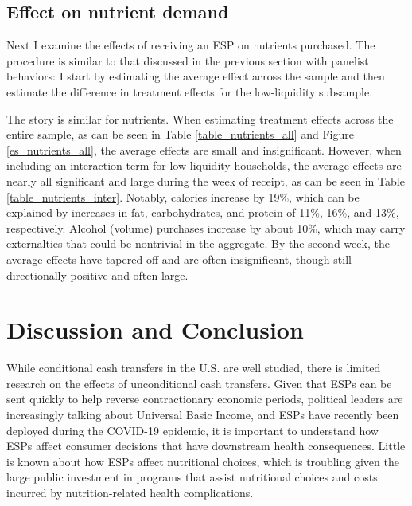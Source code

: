 \documentclass[12pt]{article}
\begin{document}
\subsection{Effect on nutrient demand}

Next I examine the effects of receiving an ESP on nutrients purchased.
The procedure is similar to that discussed in the previous section with panelist behaviors: I start by estimating the average effect across the sample and then estimate the difference in treatment effects for the low-liquidity subsample.

The story is similar for nutrients.
When estimating treatment effects across the entire sample, as can be seen in Table \ref{table_nutrients_all} and Figure \ref{es_nutrients_all}, the average effects are small and insignificant.
However, when including an interaction term for low liquidity households, the average effects are nearly all significant and large during the week of receipt, as can be seen in Table \ref{table_nutrients_inter}.
Notably, calories increase by 19\%, which can be explained by increases in fat, carbohydrates, and protein of 11\%, 16\%, and 13\%, respectively.
Alcohol (volume) purchases increase by about 10\%, which may carry externalties that could be nontrivial in the aggregate.
By the second week, the average effects have tapered off and are often insignificant, though still directionally positive and often large.

\section{Discussion and Conclusion} \label{discussion}

While conditional cash transfers in the U.S. are well studied, there is limited research on the effects of unconditional cash transfers.
Given that ESPs can be sent quickly to help reverse contractionary economic periods, political leaders are increasingly talking about Universal Basic Income, and ESPs have recently been deployed during the COVID-19 epidemic, it is important to understand how ESPs affect consumer decisions that have downstream health consequences.
Little is known about how ESPs affect nutritional choices, which is troubling given the large public investment in programs that assist nutritional choices and costs incurred by nutrition-related health complications.
\end{document}

